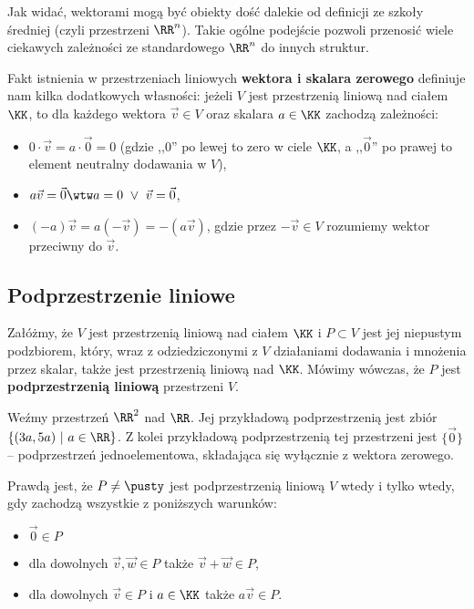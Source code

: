 Jak widać, wektorami mogą być obiekty dość dalekie od definicji ze szkoły średniej (czyli przestrzeni $\RR^n$). Takie ogólne podejście pozwoli przenosić wiele ciekawych zależności ze standardowego $\RR^n$ do innych struktur.
\bigskip

Fakt istnienia w przestrzeniach liniowych \textbf{wektora i skalara zerowego} definiuje nam kilka dodatkowych własności: jeżeli $V$ jest przestrzenią liniową nad ciałem $\KK$, to dla każdego wektora $\vec{v} \in V$ oraz skalara $a \in \KK$ zachodzą zależności:
\begin{itemize}
    \item $0 \cdot \vec{v} = a \cdot \vec{0} = 0$ (gdzie ,,$0$'' po lewej to zero w ciele $\KK$, a ,,$\vec{0}$'' po prawej to element neutralny dodawania w $V$),
    \item $a\vec{v} = \vec{0} \wtw a = 0 \ \lor \ \vec{v} = \vec{0}$,
    \item $(-a)\vec{v} = a(-\vec{v}) = -(a\vec{v})$, gdzie przez $-\vec{v} \in V$ rozumiemy wektor przeciwny do $\vec{v}$.
\end{itemize}

\subsection{Podprzestrzenie liniowe}

Załóżmy, że $V$ jest przestrzenią liniową nad ciałem $\KK$ i $P \subset V$ jest jej niepustym podzbiorem, który, wraz z odziedziczonymi z $V$ działaniami dodawania i mnożenia przez skalar, także jest przestrzenią liniową nad $\KK$. Mówimy wówczas, że $P$ jest \textbf{podprzestrzenią liniową} przestrzeni $V$.

\begin{example}
	Weźmy przestrzeń $\RR^2$ nad $\RR$. Jej przykładową podprzestrzenią jest zbiór $\{(3a, 5a) \ | \ a \in \RR\}$. Z kolei przykładową podprzestrzenią tej przestrzeni jest $\{\vec{0}\}$ -- podprzestrzeń jednoelementowa, składająca się wyłącznie z wektora zerowego.
\end{example}

Prawdą jest, że $P \neq \pusty$ jest podprzestrzenią liniową $V$ wtedy i tylko wtedy, gdy zachodzą wszystkie z poniższych warunków:
\begin{itemize}
	\item $\vec{0} \in P$
    \item dla dowolnych $\vec{v}, \vec{w} \in P$ także $\vec{v} + \vec{w} \in P$,
    \item dla dowolnych $\vec{v} \in P$ i $a \in \KK$ także $a \vec{v} \in P$.
\end{itemize}


